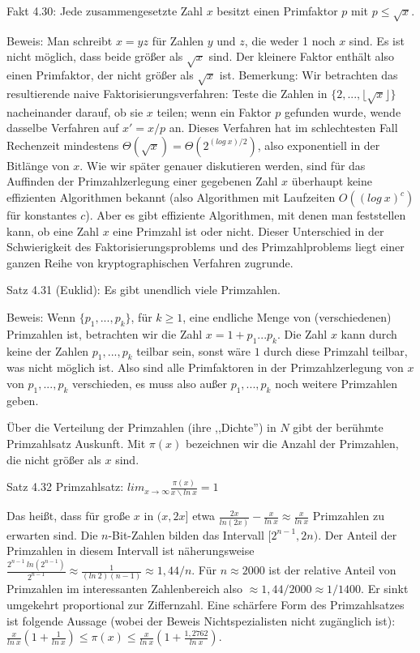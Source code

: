 \documentclass[a4paper]{article}
\begin{document}
\begin{multicols}{3}
        Fakt 4.30: Jede zusammengesetzte Zahl $x$ besitzt einen Primfaktor $p$ mit $p\leq\sqrt{x}$.

        Beweis: Man schreibt $x=yz$ für Zahlen $y$ und $z$, die weder 1 noch $x$ sind. Es ist nicht möglich, dass beide größer als $\sqrt{x}$ sind. Der kleinere Faktor enthält also einen Primfaktor, der nicht größer als $\sqrt{x}$ ist.
        Bemerkung: Wir betrachten das resultierende naive Faktorisierungsverfahren: Teste die Zahlen in $\{2,...,\lfloor\sqrt{x}\rfloor\}$ nacheinander darauf, ob sie $x$ teilen; wenn ein Faktor $p$ gefunden wurde, wende dasselbe Verfahren auf $x'=x/p$ an. Dieses Verfahren hat im schlechtesten Fall Rechenzeit mindestens $\Theta (\sqrt{x}) = \Theta (2^{(log\ x)/ 2})$, also exponentiell in der Bitlänge von $x$. Wie wir später genauer diskutieren werden, sind für das Auffinden der Primzahlzerlegung einer gegebenen Zahl $x$ überhaupt keine effizienten Algorithmen bekannt (also Algorithmen mit Laufzeiten $O((log\ x)^c)$ für konstantes $c$). Aber es gibt effiziente Algorithmen, mit denen man feststellen kann, ob eine Zahl $x$ eine Primzahl ist oder nicht. Dieser Unterschied in der Schwierigkeit des Faktorisierungsproblems und des Primzahlproblems liegt einer ganzen Reihe von kryptographischen Verfahren zugrunde.

        Satz 4.31 (Euklid): Es gibt unendlich viele Primzahlen.

        Beweis: Wenn $\{p_1,...,p_k\}$, für $k\geq 1$, eine endliche Menge von (verschiedenen) Primzahlen ist, betrachten wir die Zahl $x=1+p_1...p_k$. Die Zahl $x$ kann durch keine der Zahlen $p_1,...,p_k$ teilbar sein, sonst wäre $1$ durch diese Primzahl teilbar, was nicht möglich ist. Also sind alle Primfaktoren in der Primzahlzerlegung von $x$ von $p_1,...,p_k$ verschieden, es muss also außer $p_1,...,p_k$ noch weitere Primzahlen geben.

        Über die Verteilung der Primzahlen (ihre ,,Dichte'') in $N$ gibt der berühmte Primzahlsatz Auskunft. Mit $\pi(x)$ bezeichnen wir die Anzahl der Primzahlen, die nicht größer als $x$ sind.

        Satz 4.32 Primzahlsatz: $lim_{x\rightarrow \infty} \frac{\pi(x)}{x\backslash ln\ x}= 1$

        Das heißt, dass für große $x$ in $(x,2x]$ etwa $\frac{2x}{ln(2x)}-\frac{x}{ln\ x}\approx \frac{x}{ln\ x}$ Primzahlen zu erwarten sind. Die $n$-Bit-Zahlen bilden das Intervall $[2^{n-1} , 2n)$. Der Anteil der Primzahlen in diesem Intervall ist näherungsweise $\frac{2^{n-1}\ ln(2^{n-1})}{2^{n-1}}\approx \frac{1}{(ln\ 2)(n-1)}\approx 1,44/n$.
        Für $n\approx 2000$ ist der relative Anteil von Primzahlen im interessanten Zahlenbereich also $\approx 1,44/2000\approx 1/1400$. Er sinkt umgekehrt proportional zur Ziffernzahl.
        Eine schärfere Form des Primzahlsatzes ist folgende Aussage (wobei der Beweis Nichtspezialisten nicht zugänglich ist): $\frac{x}{ln\ x}(1+\frac{1}{ln\ x})\leq \pi(x)\leq \frac{x}{ln\ x}(1+\frac{1,2762}{ln\ x})$.


\end{multicols}
\end{document}
